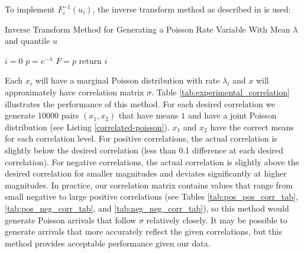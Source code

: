 To implement $F^{-1}_i(u_i)$, the inverse transform method as described in \cite{B1} is used:
\newline

\begin{algorithm}[H]
\SetAlgoLined
\caption{Inverse Transform Method for Generating a Poisson Rate Variable With Mean $\lambda$ and quantile $u$}
 $i = 0$\;
 $p = e^{-\lambda}$\;
 $F = p$\;
 return $i$ \;
\end{algorithm}

Each $x_i$ will have a marginal Poisson distribution with rate $\lambda_i$ and $x$ will approximately have correlation matrix $\sigma$. Table \ref{tab:experimental_correlation} illustrates the performance of this method. For each desired correlation we generate 10000 pairs $(x_1,x_2)$ that have means $1$ and have a joint Poisson distribution (see Listing \ref{correlated-poisson}). $x_1$ and $x_2$ have the correct means for each correlation level. For positive correlations, the actual correlation is slightly below the desired correlation (less than 0.1 difference at each desired correlation). For negative correlations, the actual correlation is slightly above the desired correlation for smaller magnitudes and deviates significantly at higher magnitudes. In practice, our correlation matrix contains values that range from small negative to large positive correlations (see Tables \ref{tab:pos_pos_corr_tab}, \ref{tab:pos_neg_corr_tab}, and \ref{tab:neg_neg_corr_tab}), so this method would generate Poisson arrivals that follow $\sigma$ relatively closely. It may be possible to generate arrivals that more accurately reflect the given correlations, but this method provides acceptable performance given our data.

